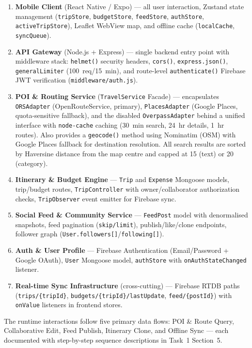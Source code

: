 \documentclass[12pt, a4paper]{article}
\newcommand{\code}[1]{\texttt{\small #1}}
\begin{document}
\begin{enumerate}
  \item \textbf{Mobile Client} (React Native / Expo) --- all user interaction, Zustand state management (\code{tripStore}, \code{budgetStore}, \code{feedStore}, \code{authStore}, \code{activeTripStore}), Leaflet WebView map, and offline cache (\code{localCache}, \code{syncQueue}).
  \item \textbf{API Gateway} (Node.js + Express) --- single backend entry point with middleware stack: \code{helmet()} security headers, \code{cors()}, \code{express.json()}, \code{generalLimiter} (100~req/15~min), and route-level \code{authenticate()} Firebase JWT verification (\code{middleware/auth.js}).
  \item \textbf{POI \& Routing Service} (\code{TravelService} Facade) --- encapsulates \code{ORSAdapter} (OpenRouteService, primary), \code{PlacesAdapter} (Google Places, quota-sensitive fallback), and the disabled \code{OverpassAdapter} behind a unified interface with \code{node-cache} caching (30~min search, 24~hr details, 1~hr routes). Also provides a \code{geocode()} method using Nominatim (OSM) with Google Places fallback for destination resolution. All search results are sorted by Haversine distance from the map centre and capped at 15 (text) or 20 (category).
  \item \textbf{Itinerary \& Budget Engine} --- \code{Trip} and \code{Expense} Mongoose models, trip/budget routes, \code{TripController} with owner/collaborator authorization checks, \code{TripObserver} event emitter for Firebase sync.
  \item \textbf{Social Feed \& Community Service} --- \code{FeedPost} model with denormalised snapshots, feed pagination (\code{skip/limit}), publish/like/clone endpoints, follower graph (\code{User.followers[]}/\code{following[]}).
  \item \textbf{Auth \& User Profile} --- Firebase Authentication (Email/Password + Google OAuth), \code{User} Mongoose model, \code{authStore} with \code{onAuthStateChanged} listener.
  \item \textbf{Real-time Sync Infrastructure} (cross-cutting) --- Firebase RTDB paths (\code{trips/\{tripId\}}, \code{budgets/\{tripId\}/lastUpdate}, \code{feed/\{postId\}}) with \code{onValue} listeners in frontend stores.
\end{enumerate}

The runtime interactions follow five primary data flows: POI \& Route Query, Collaborative Edit, Feed Publish, Itinerary Clone, and Offline Sync --- each documented with step-by-step sequence descriptions in Task~1 Section~5.
\end{document}
